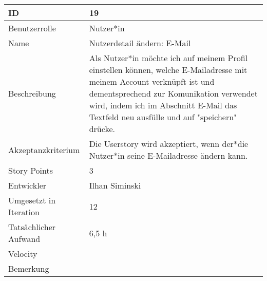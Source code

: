 \begin{tabularx}{\textwidth}{|p{}|X|}
	\hline
	ID & 19\\
	\hline
	Benutzerrolle & Nutzer*in\\
	\hline
	Name & Nutzerdetail ändern: E-Mail\\
	\hline
	Beschreibung & Als Nutzer*in möchte ich auf meinem Profil einstellen können, welche E-Mailadresse mit meinem Account verknüpft ist und dementsprechend zur Komunikation verwendet wird, indem ich im Abschnitt E-Mail das Textfeld neu ausfülle und auf "speichern" drücke.\\
	\hline
	Akzeptanzkriterium & Die Userstory wird akzeptiert, wenn der*die Nutzer*in seine E-Mailadresse ändern kann.\\
	\hline
	Story Points & 3\\
	\hline
	Entwickler & Ilhan Siminski\\
	\hline
	Umgesetzt in Iteration & 12\\ 
	\hline
	Tatsächlicher Aufwand & 6,5 h\\
	\hline
	Velocity & \\
	\hline
	Bemerkung & \\
	\hline
\end{tabularx}
\vspace{20pt}
